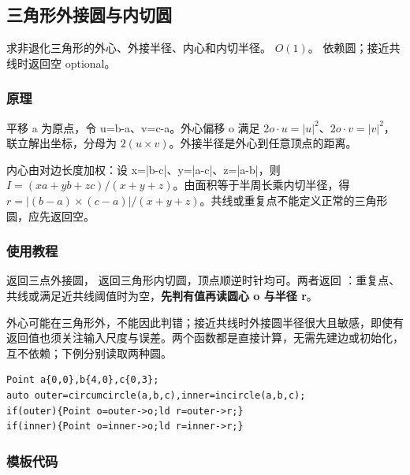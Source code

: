 \subsection{三角形外接圆与内切圆}
\label{geo:triangle}
\AlgorithmInfo
    {求非退化三角形的外心、外接半径、内心和内切半径。}
    {$O(1)$。}
    {依赖圆；接近共线时返回空 optional。}
\subsubsection*{原理}

平移 a 为原点，令 u=b-a、v=c-a。外心偏移 o 满足 $2o\cdot u=|u|^2$、$2o\cdot v=|v|^2$，联立解出坐标，分母为 $2(u\times v)$。外接半径是外心到任意顶点的距离。

内心由对边长度加权：设 x=|b-c|、y=|a-c|、z=|a-b|，则 $I=(xa+yb+zc)/(x+y+z)$。由面积等于半周长乘内切半径，得 $r=|(b-a)\times(c-a)|/(x+y+z)$。共线或重复点不能定义正常的三角形圆，应先返回空。

\subsubsection*{使用教程}
 返回三点外接圆， 返回三角形内切圆，顶点顺逆时针均可。两者返回 ：重复点、共线或满足近共线阈值时为空，\textbf{先判有值再读圆心 o 与半径 r}。

外心可能在三角形外，不能因此判错；接近共线时外接圆半径很大且敏感，即使有返回值也须关注输入尺度与误差。两个函数都是直接计算，无需先建边或初始化，互不依赖；下例分别读取两种圆。
\begin{lstlisting}[style=mtycpp,numbers=none]
Point a{0,0},b{4,0},c{0,3};
auto outer=circumcircle(a,b,c),inner=incircle(a,b,c);
if(outer){Point o=outer->o;ld r=outer->r;}
if(inner){Point o=inner->o;ld r=inner->r;}
\end{lstlisting}
\subsubsection*{模板代码}
